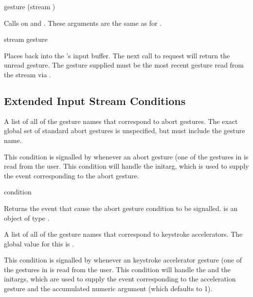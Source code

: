  {gesture \key (stream )}

Calls  on  and .  These
arguments are the same as for .

 {stream gesture}

Places  back into the  's
input buffer.  The next call to  request will return the
unread gesture.  The gesture supplied must be the most recent gesture read from
the stream via .


\subsection {Extended Input Stream Conditions}


A list of all of the gesture names that correspond to abort gestures.  The
exact global set of standard abort gestures is unspecified, but must include
the  gesture name.


This condition is signalled by  whenever an abort gesture (one
of the gestures in  is read from the user.  This condition
will handle the  initarg, which is used to supply the event
corresponding to the abort gesture.

 {condition}

Returns the event that cause the abort gesture condition to be signalled.
 is an object of type .


A list of all of the gesture names that correspond to keystroke accelerators.
The global value for this is .


This condition is signalled by  whenever an keystroke
accelerator gesture (one of the gestures in  is read
from the user.  This condition will handle the  and the
 initargs, which are used to supply the event
corresponding to the acceleration gesture and the accumulated numeric argument
(which defaults to 1).

